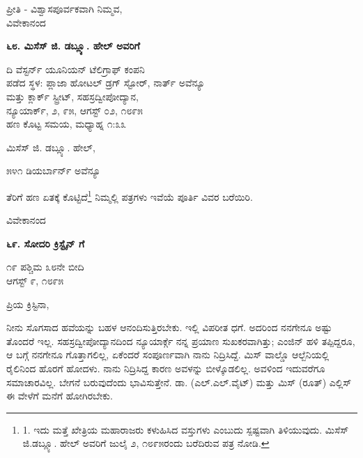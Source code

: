 \begin{flushright}
ಪ್ರೀತಿ - ವಿಶ್ವಾಸಪೂರ್ವಕವಾಗಿ ನಿಮ್ಮವ,\\ವಿವೇಕಾನಂದ
\end{flushright}

\begin{center}
\textbf{೬೮. ಮಿಸೆಸ್ ಜಿ. ಡಬ್ಲ್ಯೂ. ಹೇಲ್ ಅವರಿಗೆ}
\end{center}

\begin{flushright}
ದಿ ವೆಸ್ಟರ್ನ್ ಯೂನಿಯನ್ ಟೆಲಿಗ್ರಾಫ್ ಕಂಪನಿ\\ಪಡೆದ ಸ್ಥಳ: ಪ್ಲಾಜಾ ಹೋಟಲ್ ಡ್ರಗ್ ಸ್ಟೋರ್, ನಾರ್ತ್ ಅವೆನ್ಯೂ\\ಮತ್ತು ಕ್ಲಾರ್ಕ್ ಸ್ಟ್ರೀಟ್, ಸಹಸ್ರದ್ವೀಪೋದ್ಯಾನ,\\ನ್ಯೂಯಾರ್ಕ್, ೨, ೯೫, ಆಗಸ್ಟ್ ೦೨, ೧೮೯೫\\ ಹಣ ಕೊಟ್ಟ ಸಮಯ, ಮಧ್ಯಾಹ್ನ ೧:೩೩
\end{flushright}

ಮಿಸೆಸ್ ಜಿ. ಡಬ್ಲ್ಯೂ. ಹೇಲ್,

\begin{flushright}
೫೪೧ ಡಿಯರ್ಬಾರ್ನ್ ಅವೆನ್ಯೂ
\end{flushright}

ತೆರಿಗೆ ಹಣ ಏತಕ್ಕೆ ಕೊಟ್ಟಿದೆ\footnote{1. ಇದು ಮತ್ತೆ ಖೇತ್ರಿಯ ಮಹಾರಾಜರು ಕಳುಹಿಸಿದ ವಸ್ತುಗಳು ಎಂಬುದು ಸ್ಪಷ್ಟವಾಗಿ ತಿಳಿಯುವುದು. ಮಿಸೆಸ್ ಜಿ.ಡಬ್ಲ್ಯೂ. ಹೇಲ್ ಅವರಿಗೆ ಜುಲೈ ೨, ೧೮೯೫ರಂದು ಬರೆದಿರುವ ಪತ್ರ ನೋಡಿ.} ನಿಮ್ಮಲ್ಲಿ ಪತ್ರಗಳು ಇವೆಯೆ ಪೂರ್ತಿ ವಿವರ ಬರೆಯಿರಿ.

\begin{flushright}
ವಿವೇಕಾನಂದ
\end{flushright}

\begin{center}
\textbf{೬೯. ಸೋದರಿ ಕ್ರಿಸ್ಟೈನ್ ಗೆ}
\end{center}

\begin{flushright}
೧೯ ಪಶ್ಚಿಮ ೩೮ನೇ ಬೀದಿ\\ಆಗಸ್ಟ್ ೯, ೧೮೯೫
\end{flushright}

ಪ್ರಿಯ ಕ್ರಿಸ್ಟಿನಾ,

ನೀನು ಸೊಗಸಾದ ಹವೆಯನ್ನು ಬಹಳ ಆನಂದಿಸುತ್ತಿರಬೇಕು. ಇಲ್ಲಿ ವಿಪರೀತ ಧಗೆ. ಅದರಿಂದ ನನಗೇನೂ ಅಷ್ಟು ತೊಂದರೆ ಇಲ್ಲ. ಸಹಸ್ರದ್ವೀಪೋದ್ಯಾನದಿಂದ ನ್ಯೂಯಾರ್ಕ್ಗೆ ನನ್ನ ಪ್ರಯಾಣ ಸುಖಕರವಾಗಿತ್ತು; ಎಂಜಿನ್ ಹಳಿ ತಪ್ಪಿದ್ದರೂ, ಆ ಬಗ್ಗೆ ನನಗೇನೂ ಗೊತ್ತಾಗಲಿಲ್ಲ, ಏಕೆಂದರೆ ಸಂಪೂರ್ಣವಾಗಿ ನಾನು ನಿದ್ರಿಸಿದ್ದೆ. ಮಿಸ್ ವಾಲ್ಡೊ ಆಲ್ಬೆನಿಯಲ್ಲಿ ರೈಲಿನಿಂದ ಹೊರಗೆ ಹೋದಳು. ನಾನು ನಿದ್ರಿಸಿದ್ದ ಕಾರಣ ಅವಳನ್ನು ಬೀಳ್ಕೊಡಲಿಲ್ಲ. ಅವಳಿಂದ ಇದುವರೆಗೂ ಸಮಾಚಾರವಿಲ್ಲ. ಬೇಗನೆ ಬರುವುದೆಂದು ಭಾವಿಸುತ್ತೇನೆ. ಡಾ. (ಎಲ್.ಎಲ್.ವೈಟ್) ಮತ್ತು ಮಿಸ್ (ರೂತ್) ಎಲ್ಲಿಸ್ ಈ ವೇಳೆಗೆ ಮನೆಗೆ ಹೋಗಿರಬೇಕು.

